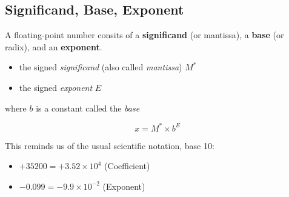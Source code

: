 \documentclass[12pt,openany]{book}
\begin{document}
			      	\subsection{Significand, Base, Exponent}
			      	A floating-point number consits of a \textbf{significand} (or mantissa), a \textbf{base} (or radix), and an \textbf{exponent}.
			      	\begin{itemize}
			      		\item[] the signed \textit{significand} (also called \textit{mantissa}) \( M^* \)
			      		\item[] the signed \textit{exponent} \( E \)
			      	\end{itemize}
			      	
			      	where \( b \) is a constant called the \textit{base}
			      	
			      	\[ x = M^* \times b^E \]
			      	
			      	This reminds us of the usual scientific notation, base 10:
			      	\begin{itemize}
			      		\item[] \( +35200 = +3.52 \times 10^4 \) (Coefficient)
			      		\item[] \( -0.099 = -9.9 \times 10^{-2} \) (Exponent)
			      	\end{itemize}
			      	
\end{document}
